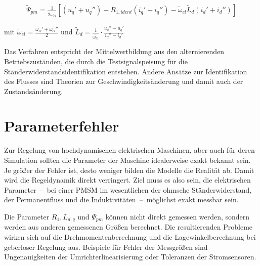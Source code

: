 \documentclass[conference,twocolumn]{IEEEtran}
\begin{document}
\begin{align}
\tilde{\Psi}_{pm} = \frac{1}{2\tilde{\omega}_{el}} \left[ (u_q' + u_q'') - R_{1,ident}(i_q' + i_q'')- \tilde{\omega}_{el}\tilde{L}_d(i_d' + i_d'') \right]
\end{align}

mit $\tilde{\omega}_{el}=\frac{\omega_{el}'+\omega_{el}''}{2}$ und $\tilde{L}_d = \frac{1}{\tilde{\omega_{el}}}\cdot \frac{u_q'' - u_q'}{i_d''-i_d'}$

Das Verfahren entspricht der Mittelwertbildung aus den alternierenden Betriebszuständen, die durch die Testsignalspeisung für die Ständerwiderstandsidentifikation entstehen.
Andere Ansätze zur Identifikation des Flusses sind Theorien zur Geschwindigkeitsänderung und damit auch der Zustandsänderung.

\section{Parameterfehler}\label{sec:parameterfehler}

Zur Regelung von hochdynamischen elektrischen Maschinen, aber auch für deren Simulation sollten die Parameter der Maschine idealerweise exakt bekannt sein.
Je größer der Fehler ist, desto weniger bilden die Modelle die Realität ab.
Damit wird die Regeldynamik direkt verringert.
Ziel muss es also sein, die elektrischen Parameter~--~bei einer PMSM im wesentlichen der ohmsche Ständerwiderstand, der Permanentfluss und die Induktivitäten~--~möglichst exakt messbar sein.

Die Parameter $R_{1}, L_{d,q}$ und $\Psi_{pm}$ können nicht direkt gemessen werden, sondern werden aus anderen gemessenen Größen berechnet.
Die resultierenden Probleme wirken sich auf die Drehmomentenberechnung und die Lagewinkelberechnung bei geberloser Regelung aus.
Beispiele für Fehler der Messgrößen sind Ungenauigkeiten der Umrichterlinearisierung oder Toleranzen der Stromsensoren.


%
%
\end{document}
